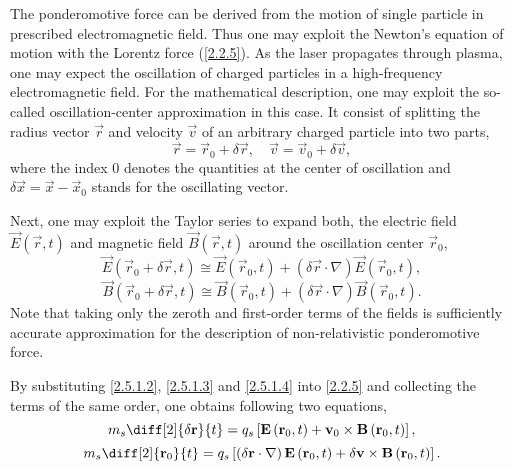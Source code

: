 The ponderomotive force can be derived from the motion of single particle in prescribed electromagnetic field. Thus one may exploit the Newton's equation of motion with the Lorentz force (\ref{2.2.5}). As the laser propagates through plasma, one may expect the oscillation of charged particles in a high-frequency electromagnetic field. For the mathematical description, one may exploit the so-called oscillation-center approximation in this case. It consist of splitting the radius vector $ \vec{r} $ and velocity $ \vec{v} $ of an arbitrary charged particle into two parts,
\begin{equation}
\label{2.5.1.2}
\vec{r} = \vec{r}_0 + \delta \vec{r}, \quad \vec{v} = \vec{v}_0 + \delta \vec{v},
\end{equation}
where the index $ 0 $ denotes the quantities at the center of oscillation and $ \delta \vec{x} = \vec{x} - \vec{x}_0 $ stands for the oscillating vector.

Next, one may exploit the Taylor series to  expand both, the electric field $ \vec{E}\left(\vec{r}, t\right) $ and magnetic field $ \vec{B}\left(\vec{r}, t\right) $ around the oscillation center $ \vec{r}_0 $,
\begin{equation}
\label{2.5.1.3}
\vec{E}\left(\vec{r}_0 + \delta \vec{r}, t\right) \cong \vec{E}\left(\vec{r}_0, t\right) + \left(\delta \vec{r} \cdot \nabla \right) \vec{E}\left(\vec{r}_0, t\right),
\end{equation}
\begin{equation}
\label{2.5.1.4}
\vec{B}\left(\vec{r}_0 + \delta \vec{r}, t\right) \cong \vec{B}\left(\vec{r}_0, t\right) + \left(\delta \vec{r} \cdot \nabla \right) \vec{B}\left(\vec{r}_0, t\right).
\end{equation}
Note that taking only the zeroth and first-order terms of the fields is sufficiently accurate approximation for the description of non-relativistic ponderomotive force.

By substituting \ref{2.5.1.2}, \ref{2.5.1.3} and \ref{2.5.1.4} into \ref{2.2.5} and collecting the terms of the same order, one obtains following two equations, 
\begin{equation}
\label{2.5.1.5}
m_s \diff[2]{\delta \vec{r}}{t} = q_s \left[ \vec{E}\left(\vec{r}_0, t\right) + \vec{v}_0 \times \vec{B}\left(\vec{r}_0, t\right)\right],
\end{equation}
\begin{equation}
\label{2.5.1.6}
m_s \diff[2]{\vec{r}_0}{t} = q_s \left[\left(\delta \vec{r} \cdot \nabla \right) \vec{E}\left(\vec{r}_0, t\right) + \delta \vec{v} \times \vec{B}\left(\vec{r}_0, t\right) \right]. 
\end{equation}


